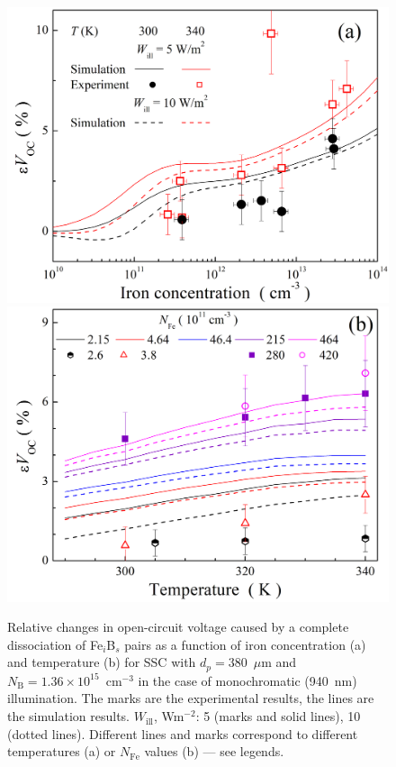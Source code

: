 \documentclass[a4paper,fleqn]{cas-sc}
\begin{document}
\begin{figure}
	\centering
     \includegraphics[width=0.4\linewidth]{Fig7a.png}
     \includegraphics[width=0.4\linewidth]{Fig7b.png}
	  \caption{Relative changes in open-circuit voltage caused by a complete
       dissociation of Fe$_i$B$_s$ pairs as a function of iron concentration (a) and
       temperature (b) for SSC with $d_p=380$~$\mu$m and $N_\mathrm{B}=1.36\times10^{15}$~cm$^{-3}$
       in the case of monochromatic (940~nm) illumination.
       The marks are the experimental results, the lines are the simulation results.
       $W_\mathrm{ill}$, Wm$^{-2}$: 5 (marks and solid lines), 10 (dotted lines).
       Different lines and marks correspond to different temperatures (a) or $N_\mathrm{Fe}$ values (b) --- see legends.
}\label{fig7}
\end{figure}
\end{document}
